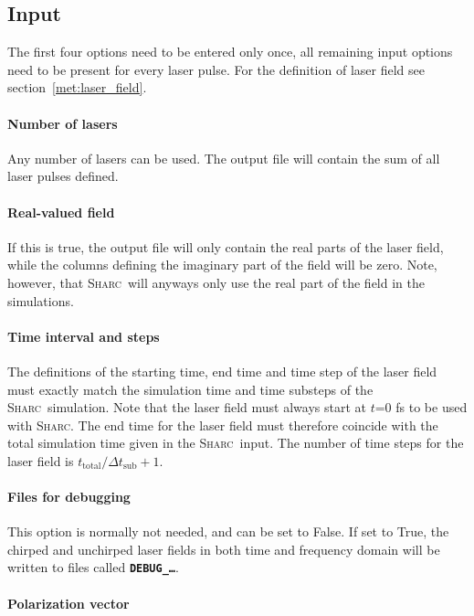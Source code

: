\documentclass[a4paper,11pt,DIV=15,openany,twoside=false]{scrbook}
\newcommand{\sharc}{\textsc{Sharc}}
\newcommand{\ttt}[1]{\textbf{\texttt{#1}}}
\begin{document}
\subsection{Input}

The first four options need to be entered only once, all remaining input options need to be present for every laser pulse. For the definition of laser field see section~\ref{met:laser_field}.

\paragraph{Number of lasers}

Any number of lasers can be used. The output file will contain the sum of all laser pulses defined.

\paragraph{Real-valued field}

If this is true, the output file will only contain the real parts of the laser field, while the columns defining the imaginary part of the field will be zero. Note, however, that \sharc\ will anyways only use the real part of the field in the simulations.

\paragraph{Time interval and steps}

The definitions of the starting time, end time and time step of the laser field must exactly match the simulation time and time substeps of the \sharc\ simulation. Note that the laser field must always start at $t$=0 fs to be used with \sharc. The end time for the laser field must therefore coincide with the total simulation time given in the \sharc\ input. The number of time steps for the laser field is $t_\text{total}/\Delta t_\text{sub} +1$.

\paragraph{Files for debugging}

This option is normally not needed, and can be set to False. If set to True, the chirped and unchirped laser fields in both time and frequency domain will be written to files called \ttt{DEBUG\_\dots}.

\paragraph{Polarization vector}
\end{document}

